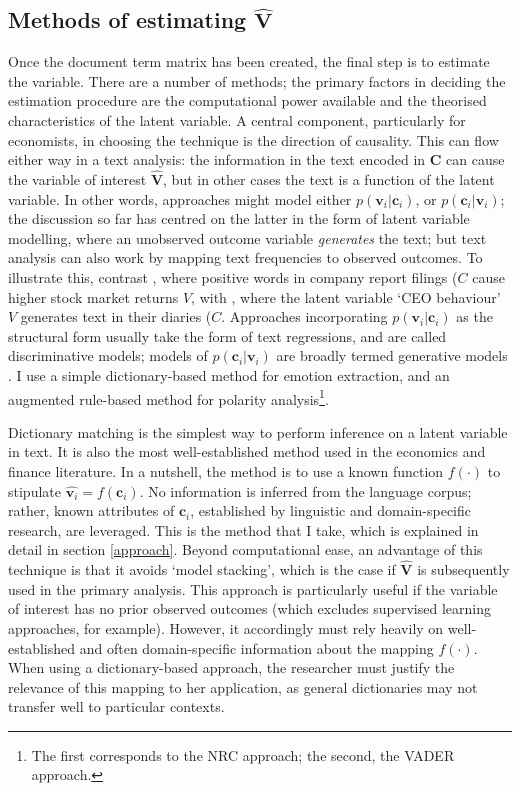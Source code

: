 \documentclass{article}
\begin{document}
\subsection{Methods of estimating \(\hat{\mathbf{V}}\)}
Once the document term matrix has been created, the final step is to estimate the variable. There are a number of methods; the primary factors in deciding the estimation procedure are the computational power available and the theorised characteristics of the latent variable. A central component, particularly for economists, in choosing the technique is the direction of causality. This can flow either way in a text analysis: the information in the text encoded in \(\mathbf{C}\) can cause the variable of interest \(\hat{\mathbf{V}}\), but in other cases the text is a function of the latent variable. In other words, approaches might model either \(p(\mathbf{v}_i|\mathbf{c}_i)\), or \(p(\mathbf{c}_i|\mathbf{v}_i)\); the discussion so far has centred on the latter in the form of latent variable modelling, where an unobserved outcome variable \textit{generates} the text; but text analysis can also work by mapping text frequencies to observed outcomes. To illustrate this, contrast \textcite{jegadeeshWordPowerNew2013}, where positive words in company report filings (\(C\) cause higher stock market returns \(V\), with \textcite{bandieraCeoBehaviorFirm2020}, where the latent variable `CEO behaviour' \(V\) generates text in their diaries (\(C\). Approaches incorporating \(p(\mathbf{v}_i|\mathbf{c}_i)\) as the structural form usually take the form of text regressions, and are called discriminative models; models of \(p(\mathbf{c}_i|\mathbf{v}_i)\) are broadly termed generative models \parencite[81]{jurafskySpeechLanguageProcessing2009}.  I use a simple dictionary-based method for emotion extraction, and an augmented rule-based method for polarity analysis\footnote{The first corresponds to the NRC approach; the second, the VADER approach.}.

Dictionary matching is the simplest way to perform inference on a latent variable in text. It is also the most well-established method used in the economics and finance literature. In a nutshell, the method is to use a known function \(f(\cdot)\) to stipulate \(\hat{\mathbf{v}_i} = f(\mathbf{c}_i)\). No information is inferred from the language corpus; rather, known attributes of \(\mathbf{c}_i\), established by linguistic and domain-specific research, are leveraged. This is the method that I take, which is explained in detail in section \ref{approach}. Beyond computational ease, an advantage of this technique is that it avoids `model stacking', which is the case if \(\hat{\mathbf{V}}\) is subsequently used in the primary analysis. This approach is particularly useful if the variable of interest has no prior observed outcomes (which excludes supervised learning approaches, for example). However, it accordingly must rely heavily on well-established and often domain-specific information about the mapping \(f(\cdot  )\). When using a dictionary-based approach, the researcher must justify the relevance of this mapping to her application, as general dictionaries may not transfer well to particular contexts. 
\end{document}
